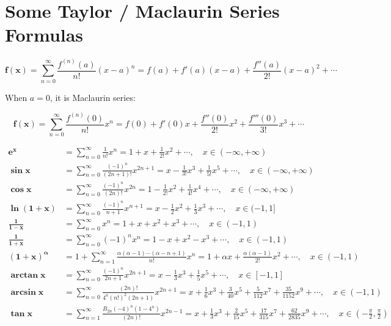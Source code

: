 \documentclass[12pt]{article}
\begin{document}
	\fancyhf{}
	\section*{Some Taylor / Maclaurin  Series Formulas}

	\[\boldsymbol{f(x)} = \sum_{n=0}^{\infty} \frac{f^{(n)}(a)}{n!}(x-a)^n = f(a) + f'(a)(x-a) + \frac{f''(a)}{2!}(x-a)^2 + \cdots\]

	When $a=0$, it is Maclaurin series:

	\[\boldsymbol{f(x)} = \sum_{n=0}^{\infty} \frac{f^{(n)}(0)}{n!}x^n = f(0) + f'(0)x + \frac{f''(0)}{2!}x^2 + \frac{f'''(0)}{3!}x^3 + \cdots\]

	\[\begin{aligned}
		\boldsymbol{e^{x}}&=\sum_{n=0}^{\infty} \frac{1}{n !} x^{n}=1+x+\frac{1}{2 !} x^{2}+\cdots, \quad x \in(-\infty,+\infty) \\[1ex]
		\boldsymbol{\sin x}&=\sum_{n=0}^{\infty} \frac{(-1)^{n}}{(2 n+1) !} x^{2 n+1}=x-\frac{1}{3 !} x^{3}+\frac{1}{5 !} x^{5}+\cdots,\quad x \in(-\infty,+\infty) \\[1ex]
		\boldsymbol{\cos x}&=\sum_{n=0}^{\infty} \frac{(-1)^{n}}{(2 n) !} x^{2 n}=1-\frac{1}{2 !} x^{2}+\frac{1}{4 !} x^{4}+\cdots,\quad  x \in(-\infty,+\infty) \\[1ex]
		\boldsymbol{\ln (1+x)}&=\sum_{n=0}^{\infty} \frac{(-1)^{n}}{n+1} x^{n+1}=x-\frac{1}{2} x^{2}+\frac{1}{3} x^{3}+\cdots,\quad  x \in(-1,1] \\[1ex]
		\boldsymbol{\frac{1}{1-x}}&=\sum_{n=0}^{\infty} x^{n}=1+x+x^{2}+x^{3}+\cdots,\quad  x \in(-1,1) \\[1ex]
		\boldsymbol{\frac{1}{1+x}}&=\sum_{n=0}^{\infty}(-1)^{n} x^{n}=1-x+x^{2}-x^{3}+\cdots,\quad  x \in(-1,1)\\[1ex]
		\boldsymbol{(1+x)^{\alpha}}&=1+\sum_{n=1}^{\infty} \frac{\alpha(\alpha-1) \cdots(\alpha-n+1)}{n !} x^{n}=1+\alpha x+\frac{\alpha(\alpha-1)}{2 !} x^{2}+\cdots,\quad  x \in(-1,1) \\[1ex]
		\boldsymbol{\arctan x}&=\sum_{n=0}^{\infty} \frac{(-1)^{n}}{2 n+1} x^{2 n+1}=x-\frac{1}{3} x^{3}+\frac{1}{5} x^{5}+\cdots,\quad  x \in[-1,1] \\[1ex]
		\boldsymbol{\arcsin x}&=\sum_{n=0}^{\infty} \frac{(2 n) !}{4^{n}(n !)^{2}(2 n+1)} x^{2n+1}=x+\frac{1}{6} x^{3}+\frac{3}{40} x^{5}+\frac{5}{112} x^{7}+\frac{35}{1152} x^{9}+\cdots,\quad  x \in(-1,1)\\[1ex]
		\boldsymbol{\tan x}&=\sum_{n=1}^{\infty} \frac{B_{2 n}(-4)^{n}\left(1-4^{n}\right)}{(2 n) !} x^{2 n-1}=x+\frac{1}{3} x^{3}+\frac{2}{15} x^{5}+\frac{17}{315} x^{7}+\frac{62}{2835} x^{9}+\cdots,\quad x\in (-\frac{\pi}{2},\frac{\pi}{2})
	\end{aligned}\]
	\newpage
\end{document}
